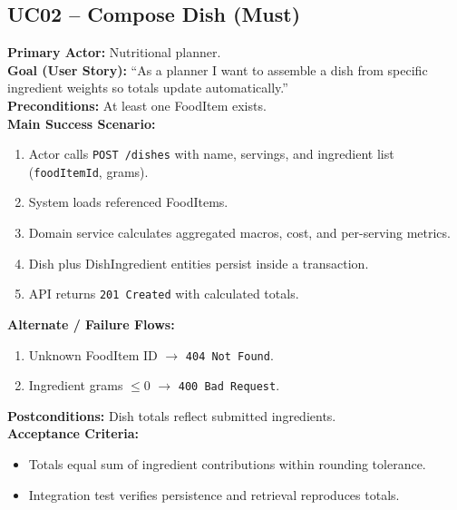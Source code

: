 \documentclass[11pt]{article}
\begin{document}
\subsection*{UC02 -- Compose Dish (Must)}
\textbf{Primary Actor:} Nutritional planner.\\
\textbf{Goal (User Story):} ``As a planner I want to assemble a dish from specific ingredient weights so totals update automatically.''\\
\textbf{Preconditions:} At least one FoodItem exists.\\
\textbf{Main Success Scenario:}
\begin{enumerate}[label=\arabic*.]
  \item Actor calls \texttt{POST /dishes} with name, servings, and ingredient list (\texttt{foodItemId}, grams).
  \item System loads referenced FoodItems.
  \item Domain service calculates aggregated macros, cost, and per-serving metrics.
  \item Dish plus DishIngredient entities persist inside a transaction.
  \item API returns \texttt{201 Created} with calculated totals.
\end{enumerate}
\textbf{Alternate / Failure Flows:}
\begin{enumerate}[label=\arabic*F.]
  \item Unknown FoodItem ID $\rightarrow$ \texttt{404 Not Found}.
  \item Ingredient grams $\leq 0$ $\rightarrow$ \texttt{400 Bad Request}.
\end{enumerate}
\textbf{Postconditions:} Dish totals reflect submitted ingredients.\\
\textbf{Acceptance Criteria:}
\begin{itemize}[noitemsep]
  \item Totals equal sum of ingredient contributions within rounding tolerance.
  \item Integration test verifies persistence and retrieval reproduces totals.
\end{itemize}
\end{document}
